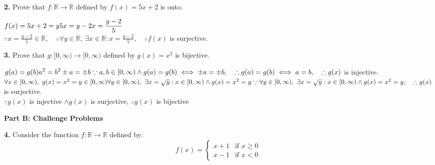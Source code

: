\documentclass[12pt]{article}
\begin{document}
\textbf{2.} Prove that $f: \mathbb{R} \to \mathbb{R}$ defined by $f(x) = 5x + 2$ is onto.
\begin{adjustwidth}{1.5cm}{}
\begin{minipage}[t][4cm][t]{\linewidth}
    $\displaystyle f(x) = 5x+2 = y
    \\[8pt] 5x = y-2
    \\[8pt] x = \frac{y-2}{5}$
    \\[8pt] $\because x = \frac{y-2}{5} \in \mathbb{R}, \quad \therefore \forall y \in \mathbb{R}, \ \exists x \in \mathbb{R} : x = \frac{y-2}{5}, \quad \therefore f(x)$ is surjective.
\end{minipage}
\end{adjustwidth}

\textbf{3.} Prove that $g: [0, \infty) \to [0, \infty)$ defined by $g(x) = x^2$ is bijective.
\begin{adjustwidth}{1.5cm}{}
\begin{minipage}[t][7cm][t]{\linewidth}
    $\displaystyle g(a) = g(b)
    \\[8pt] a^2 = b^2
    \\[8pt] \pm a = \pm b
    \\[8pt] \because a, b \in [0, \infty) \wedge g(a) = g(b) \iff \pm a = \pm b, \quad \therefore g(a) = g(b) \iff a= b, \quad \therefore g(x)$ is injective.
    \\[8pt] $\forall x \in [0, \infty), \ g(x) = x^2 = y \in [0, \infty)
    \\[8pt] \forall y \in [0, \infty), \ \exists x = \sqrt{y} : x \in [0, \infty) \wedge g(x) = x^2 = y
    \\[8pt] \because \forall y \in [0, \infty), \ \exists x = \sqrt{y} : x \in [0, \infty) \wedge g(x) = x^2 = y, \quad \therefore g(x)$ is surjective.
    \\[8pt] $\because g(x)$ is injective $\wedge g(x)$ is surjective, $\therefore g(x)$ is bijective
\end{minipage}
\end{adjustwidth}

\textbf{Part B: Challenge Problems}

\textbf{4.} Consider the function $f: \mathbb{R} \to \mathbb{R}$ defined by:
$$f(x) = \begin{cases} 
x + 1 & \text{if } x \geq 0 \\
x - 1 & \text{if } x < 0
\end{cases}$$
\end{document}
